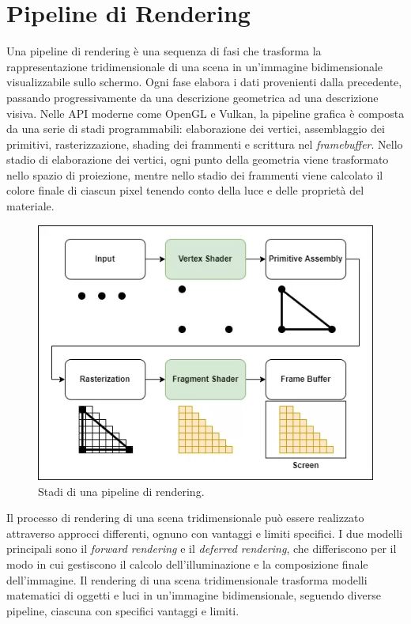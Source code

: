 \documentclass[12pt,a4paper,openright,twoside]{book}
\begin{document}
\section{Pipeline di Rendering}
Una pipeline di rendering è una sequenza di fasi che trasforma la rappresentazione tridimensionale di una scena in
un'immagine bidimensionale visualizzabile sullo schermo. Ogni fase elabora i dati provenienti dalla precedente,
passando progressivamente da una descrizione geometrica ad una descrizione visiva.
Nelle API moderne come OpenGL e Vulkan, la pipeline grafica è composta da una serie di stadi programmabili:
elaborazione dei vertici, assemblaggio dei primitivi, rasterizzazione, shading dei frammenti e scrittura nel \emph{framebuffer}.
Nello stadio di elaborazione dei vertici, ogni punto della geometria viene trasformato nello spazio di proiezione,
mentre nello stadio dei frammenti viene calcolato il colore finale di ciascun pixel tenendo conto della luce e delle
proprietà del materiale.
\begin{figure}[H]
   \centering
   \includegraphics[width=.8\linewidth]{figures/rendering_pipeline_overview.png}
   \caption{Stadi di una pipeline di rendering.}
   \label{fig:rendering-pipeline-overview}
\end{figure}
Il processo di rendering di una scena tridimensionale può essere realizzato attraverso approcci differenti,
ognuno con vantaggi e limiti specifici. I due modelli principali sono il \emph{forward rendering} e il
\emph{deferred rendering}, che differiscono per il modo in cui gestiscono il calcolo dell'illuminazione e la
composizione finale dell'immagine.
Il rendering di una scena tridimensionale trasforma modelli matematici di oggetti e luci in un'immagine bidimensionale,
seguendo diverse pipeline, ciascuna con specifici vantaggi e limiti.
\end{document}
